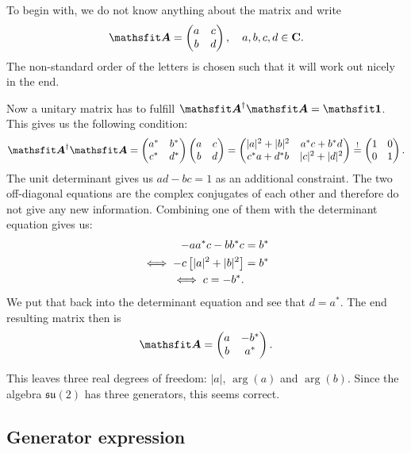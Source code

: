 \documentclass[11pt, english, fleqn, DIV=15, headinclude, BCOR=1cm]{scrartcl}
\begin{document}
To begin with, we do not know anything about the matrix and write
\[
    \tens A = \begin{pmatrix}
        a & c \\ b & d
    \end{pmatrix}
    \eqnsep
    a, b, c, d \in \C.
\]
The non-standard order of the letters is chosen such that it will work out
nicely in the end.

Now a unitary matrix has to fulfill $\tens A^\dagger \tens A = \tens 1$. This
gives us the following condition:
\[
    \tens A^\dagger \tens A
    =
    \begin{pmatrix}
        a^* & b^* \\ c^* & d^*
    \end{pmatrix}
    \begin{pmatrix}
        a & c \\ b & d
    \end{pmatrix}
    =
    \begin{pmatrix}
        |a|^2 + |b|^2 & a^*c + b^*d \\
        c ^*a + d^*b & |c|^2 + |d|^2
    \end{pmatrix}
    \overset !=
    \begin{pmatrix}
        1 & 0 \\ 0 & 1
    \end{pmatrix}.
\]
The unit determinant gives us $ad-bc=1$ as an additional constraint. The two
off-diagonal equations are the complex conjugates of each other and therefore
do not give any new information. Combining one of them with the determinant
equation gives us:
\begin{align*}
    - aa^*c - bb^*c &= b^* \\
    \iff -c \left[ |a|^2 + |b|^2 \right] &= b^* \\
    \iff c = - b^*.
\end{align*}
We put that back into the determinant equation and see that $d = a^*$. The end
resulting matrix then is
\[
    \tens A = \begin{pmatrix}
        a & -b^* \\ b & a^*
    \end{pmatrix}.
\]

This leaves three real degrees of freedom: $|a|$, $\arg(a)$ and $\arg(b)$.
Since the algebra $\mathfrak{su}(2)$ has three generators, this seems correct.

\subsection{Generator expression}
\end{document}
